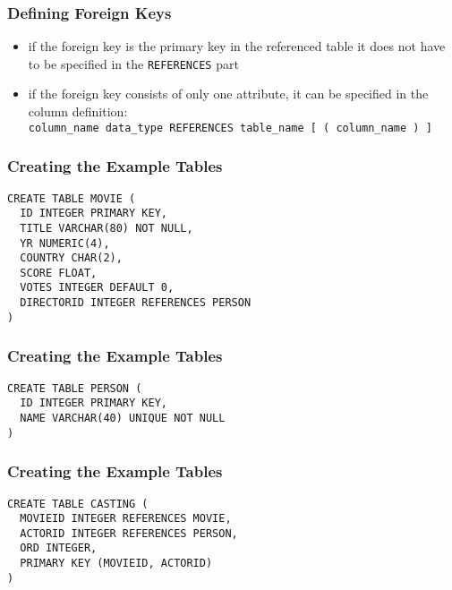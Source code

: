 \documentclass[dvipsnames]{beamer}
\theoremstyle{plain}
\begin{document}
\begin{frame}[fragile]
  \frametitle{Defining Foreign Keys}

  \begin{itemize}
    \item if the foreign key is the primary key in the referenced table
      it does not have to be specified in the \lstinline!REFERENCES! part

    \pause
    \item if the foreign key consists of only one attribute, it can be
      specified in the column definition:\\
      \lstinline!column_name data_type REFERENCES table_name [ ( column_name ) ]!
  \end{itemize}
\end{frame}

\begin{frame}[fragile]
  \frametitle{Creating the Example Tables}

  \begin{example}
    \begin{lstlisting}
CREATE TABLE MOVIE (
  ID INTEGER PRIMARY KEY,
  TITLE VARCHAR(80) NOT NULL,
  YR NUMERIC(4),
  COUNTRY CHAR(2),
  SCORE FLOAT,
  VOTES INTEGER DEFAULT 0,
  DIRECTORID INTEGER REFERENCES PERSON
)
    \end{lstlisting}
  \end{example}
\end{frame}

\begin{frame}[fragile]
  \frametitle{Creating the Example Tables}

  \begin{example}
    \begin{lstlisting}
CREATE TABLE PERSON (
  ID INTEGER PRIMARY KEY,
  NAME VARCHAR(40) UNIQUE NOT NULL
)
    \end{lstlisting}
  \end{example}
\end{frame}

\begin{frame}[fragile]
  \frametitle{Creating the Example Tables}

  \begin{example}
    \begin{lstlisting}
CREATE TABLE CASTING (
  MOVIEID INTEGER REFERENCES MOVIE,
  ACTORID INTEGER REFERENCES PERSON,
  ORD INTEGER,
  PRIMARY KEY (MOVIEID, ACTORID)
)
    \end{lstlisting}
  \end{example}
\end{frame}
\end{document}
